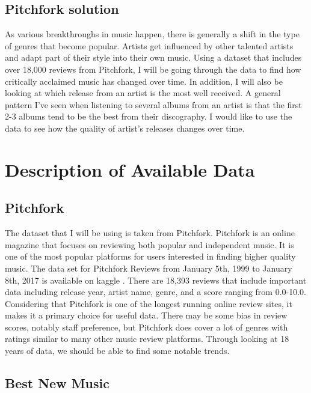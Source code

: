 \documentclass{article}
\begin{document}
\subsection{Pitchfork solution}\label{pitchfork-solution}

As various breakthroughs in music happen, there is generally a shift in
the type of genres that become popular. Artists get influenced by other
talented artists and adapt part of their style into their own music.
Using a dataset that includes over 18,000 reviews from Pitchfork, I will
be going through the data to find how critically acclaimed music has
changed over time. In addition, I will also be looking at which release
from an artist is the most well received. A general pattern I've seen
when listening to several albums from an artist is that the first 2-3
albums tend to be the best from their discography. I would like to use
the data to see how the quality of artist's releases changes over time.

\section{Description of Available
Data}\label{description-of-available-data}

\subsection{Pitchfork}\label{pitchfork}

The dataset that I will be using is taken from Pitchfork. Pitchfork is
an online magazine that focuses on reviewing both popular and
independent music. It is one of the most popular platforms for users
interested in finding higher quality music. The data set for Pitchfork
Reviews from January 5th, 1999 to January 8th, 2017 is available on
kaggle \citep{kaggle}. There are 18,393 reviews that include important
data including release year, artist name, genre, and a score ranging
from 0.0-10.0. Considering that Pitchfork is one of the longest running
online review sites, it makes it a primary choice for useful data. There
may be some bias in review scores, notably staff preference, but
Pitchfork does cover a lot of genres with ratings similar to many other
music review platforms. Through looking at 18 years of data, we should
be able to find some notable trends.

\subsection{Best New Music}\label{best-new-music}
\end{document}
